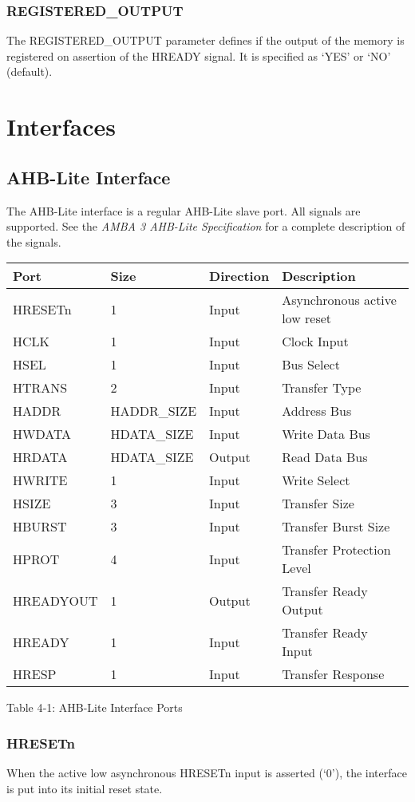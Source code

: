 \subsubsection{REGISTERED\_OUTPUT}\label{registered_output}

The REGISTERED\_OUTPUT parameter defines if the output of the memory is
registered on assertion of the HREADY signal. It is specified as `YES'
or `NO' (default).

\section{Interfaces}\label{interfaces}

\subsection{AHB-Lite Interface}\label{ahb-lite-interface}

The AHB-Lite interface is a regular AHB-Lite slave port. All signals are
supported. See the \emph{AMBA 3 AHB-Lite Specification} for a complete
description of the signals.

\begin{longtable}[]{@{}llll@{}}
\toprule
Port & Size & Direction & Description\tabularnewline
\midrule
\endhead
HRESETn & 1 & Input & Asynchronous active low reset\tabularnewline
HCLK & 1 & Input & Clock Input\tabularnewline
HSEL & 1 & Input & Bus Select\tabularnewline
HTRANS & 2 & Input & Transfer Type\tabularnewline
HADDR & HADDR\_SIZE & Input & Address Bus\tabularnewline
HWDATA & HDATA\_SIZE & Input & Write Data Bus\tabularnewline
HRDATA & HDATA\_SIZE & Output & Read Data Bus\tabularnewline
HWRITE & 1 & Input & Write Select\tabularnewline
HSIZE & 3 & Input & Transfer Size\tabularnewline
HBURST & 3 & Input & Transfer Burst Size\tabularnewline
HPROT & 4 & Input & Transfer Protection Level\tabularnewline
HREADYOUT & 1 & Output & Transfer Ready Output\tabularnewline
HREADY & 1 & Input & Transfer Ready Input\tabularnewline
HRESP & 1 & Input & Transfer Response\tabularnewline
\bottomrule
\end{longtable}

\protect\hypertarget{_Toc326677769}{}{}Table 4‑1: AHB-Lite Interface
Ports

\subsubsection{HRESETn}\label{hresetn}

When the active low asynchronous HRESETn input is asserted (`0'), the
interface is put into its initial reset state.

